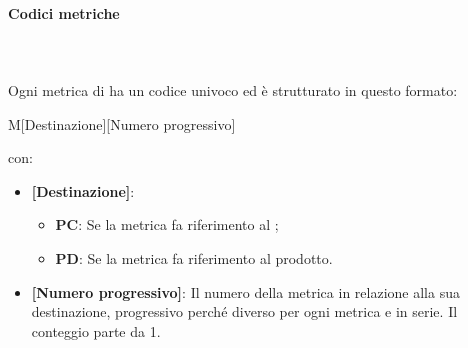 \paragraph{Codici metriche}\mbox{}\\ \\
Ogni metrica di  ha un codice univoco ed è strutturato in questo formato:
\begin{center}
    M[Destinazione][Numero progressivo]
\end{center}
con:
\begin{itemize}  
    \item \textbf{[Destinazione]}:
    \begin{itemize}
        \item \textbf{PC}: Se la metrica fa riferimento al ;
        \item \textbf{PD}: Se la metrica fa riferimento al prodotto.
    \end{itemize}
    \item \textbf{[Numero progressivo]}: Il numero della metrica in relazione alla sua destinazione, progressivo perché diverso per ogni metrica e in serie. Il conteggio parte da 1.
\end{itemize}


